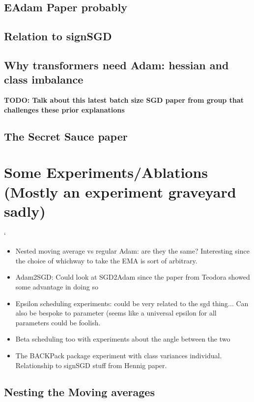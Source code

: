 \documentclass[12pt]{book}
\newcommand{\todo}[1]{{\color{red}\bf{TODO: #1}}}
\begin{document}
\subsection*{EAdam Paper probably}
\subsection*{Relation to signSGD}
\subsection*{Why transformers need Adam: hessian and class imbalance}
\todo{Talk about this latest batch size SGD paper from group that challenges these prior explanations}
\subsection*{The Secret Sauce paper}

\section{Some Experiments/Ablations (Mostly an experiment graveyard sadly)}`
\begin{itemize}
\item Nested moving average vs regular Adam: are they the same? Interesting since the choice of whichway to take the EMA is sort of arbitrary. 
\item Adam2SGD: Could look at SGD2Adam since the paper from Teodora showed some advantage in doing so
\item Epsilon scheduling experiments: could be very related to the sgd thing... Can also be bespoke to parameter (seems like a universal epsilon for all parameters could be foolish. 
\item Beta scheduling too with experiments about the angle between the two 
\item The BACKPack package experiment with class variances individual. Relationship to signSGD stuff from Hennig paper.
\end{itemize}
\subsection{Nesting the Moving averages}
\end{document}
